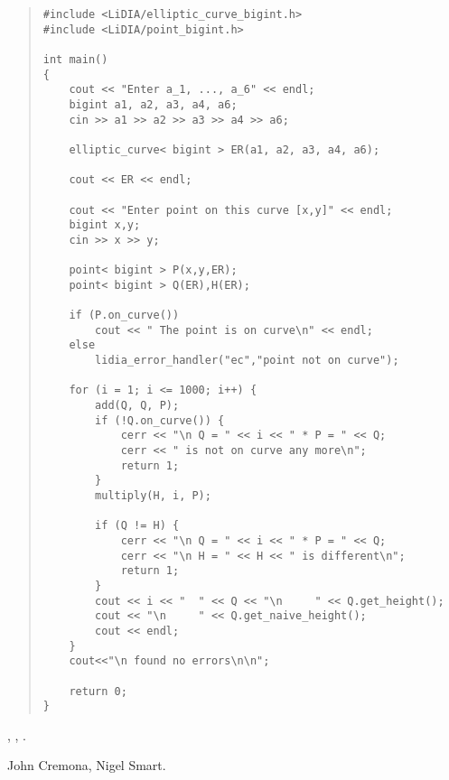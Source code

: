 \begin{quote}
\begin{verbatim}
#include <LiDIA/elliptic_curve_bigint.h>
#include <LiDIA/point_bigint.h>

int main()
{
    cout << "Enter a_1, ..., a_6" << endl;
    bigint a1, a2, a3, a4, a6;
    cin >> a1 >> a2 >> a3 >> a4 >> a6;

    elliptic_curve< bigint > ER(a1, a2, a3, a4, a6);

    cout << ER << endl;

    cout << "Enter point on this curve [x,y]" << endl;
    bigint x,y;
    cin >> x >> y;

    point< bigint > P(x,y,ER);
    point< bigint > Q(ER),H(ER);

    if (P.on_curve())
        cout << " The point is on curve\n" << endl;
    else
        lidia_error_handler("ec","point not on curve");

    for (i = 1; i <= 1000; i++) {
        add(Q, Q, P);
        if (!Q.on_curve()) {
            cerr << "\n Q = " << i << " * P = " << Q;
            cerr << " is not on curve any more\n";
            return 1;
        }
        multiply(H, i, P);

        if (Q != H) {
            cerr << "\n Q = " << i << " * P = " << Q;
            cerr << "\n H = " << H << " is different\n";
            return 1;
        }
        cout << i << "  " << Q << "\n     " << Q.get_height();
        cout << "\n     " << Q.get_naive_height();
        cout << endl;
    }
    cout<<"\n found no errors\n\n";

    return 0;
}
\end{verbatim}
\end{quote}



\SEEALSO

,
,
.



\AUTHOR

John Cremona, Nigel Smart.
